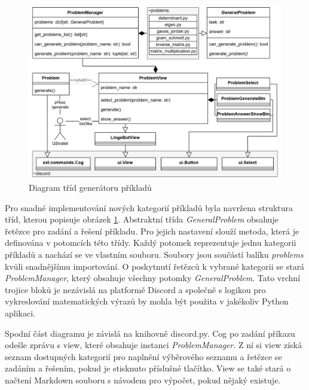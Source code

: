 \documentclass[FM]{tulthesis}
\begin{document}
	\begin{figure}[ht]
		\centering
		\includegraphics[width=\textwidth]{img/ProblemsDiagram}
		\caption{Diagram tříd generátoru příkladů}
		\label{_tag_img_problemuml}
	\end{figure}
	
	Pro snadné implementování nových kategorií příkladů byla navržena struktura tříd, kterou popisuje obrázek \ref{_tag_img_problemuml}. Abstraktní třída \textit{GeneralProblem} obsahuje řetězce pro zadání a řešení příkladu. Pro jejich nastavení slouží metoda, která je definována v potomcích této třídy. Každý potomek reprezentuje jednu kategorii příkladů a nachází se ve vlastním souboru. Soubory jsou součástí balíku \textit{problems} kvůli snadnějšímu importování. O poskytnutí řetězců k vybrané kategorii se stará \mbox{\textit{ProblemManager}}, který obsahuje všechny potomky \textit{GeneralProblem}. Tato vrchní trojice bloků je nezávislá na platformě Discord a společně s logikou pro vykreslování matematických výrazů by mohla být použita v jakékoliv Python aplikaci.
	
	Spodní část diagramu je závislá na knihovně discord.py. Cog po zadání příkazu odešle zprávu s view, které obsahuje instanci \textit{ProblemManager}. Z ní si view získá seznam dostupných kategorií pro naplnění výběrového seznamu a řetězce se zadáním a řešením, pokud je stisknuto příslušné tlačítko. View se také stará o načtení Markdown souboru s návodem pro výpočet, pokud nějaký existuje.
	
\end{document}
